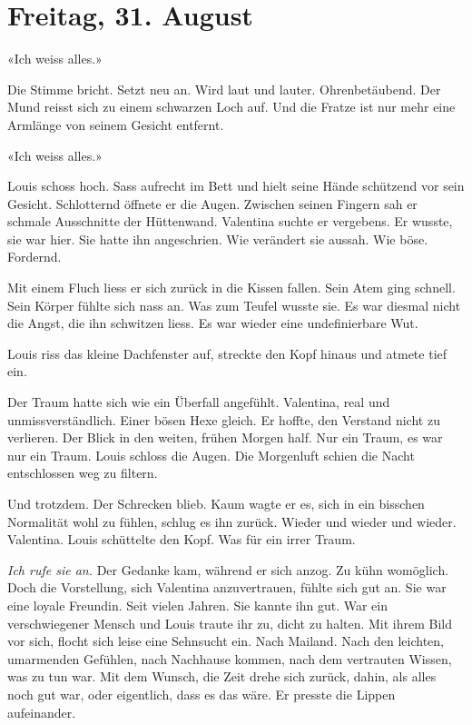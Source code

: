 \section{Freitag, 31. August}\label{freitag-31.-august}

«Ich weiss alles.»

Die Stimme bricht. Setzt neu an. Wird laut und lauter. Ohrenbetäubend.
Der Mund reisst sich zu einem schwarzen Loch auf. Und die Fratze ist nur
mehr eine Armlänge von seinem Gesicht entfernt.

«Ich weiss alles.»

Louis schoss hoch. Sass aufrecht im Bett und hielt seine Hände schützend
vor sein Gesicht. Schlotternd öffnete er die Augen. Zwischen seinen
Fingern sah er schmale Ausschnitte der Hüttenwand. Valentina suchte er
vergebens. Er wusste, sie war hier. Sie hatte ihn angeschrien. Wie
verändert sie aussah. Wie böse. Fordernd.

Mit einem Fluch liess er sich zurück in die Kissen fallen. Sein Atem
ging schnell. Sein Körper fühlte sich nass an. Was zum Teufel wusste
sie. Es war diesmal nicht die Angst, die ihn schwitzen liess. Es war
wieder eine undefinierbare Wut.

Louis riss das kleine Dachfenster auf, streckte den Kopf hinaus und
atmete tief ein.

Der Traum hatte sich wie ein Überfall angefühlt. Valentina, real und
unmissverständlich. Einer bösen Hexe gleich. Er hoffte, den Verstand
nicht zu verlieren. Der Blick in den weiten, frühen Morgen half. Nur ein
Traum, es war nur ein Traum. Louis schloss die Augen. Die Morgenluft
schien die Nacht entschlossen weg zu filtern.

Und trotzdem. Der Schrecken blieb. Kaum wagte er es, sich in ein
bisschen Normalität wohl zu fühlen, schlug es ihn zurück. Wieder und
wieder und wieder. Valentina. Louis schüttelte den Kopf. Was für ein
irrer Traum.

\emph{Ich rufe sie an.} Der Gedanke kam, während er sich anzog. Zu kühn
womöglich. Doch die Vorstellung, sich Valentina anzuvertrauen, fühlte
sich gut an. Sie war eine loyale Freundin. Seit vielen Jahren. Sie
kannte ihn gut. War ein verschwiegener Mensch und Louis traute ihr zu,
dicht zu halten. Mit ihrem Bild vor sich, flocht sich leise eine
Sehnsucht ein. Nach Mailand. Nach den leichten, umarmenden Gefühlen,
nach Nachhause kommen, nach dem vertrauten Wissen, was zu tun war. Mit
dem Wunsch, die Zeit drehe sich zurück, dahin, als alles noch gut war,
oder eigentlich, dass es das wäre. Er presste die Lippen aufeinander.

